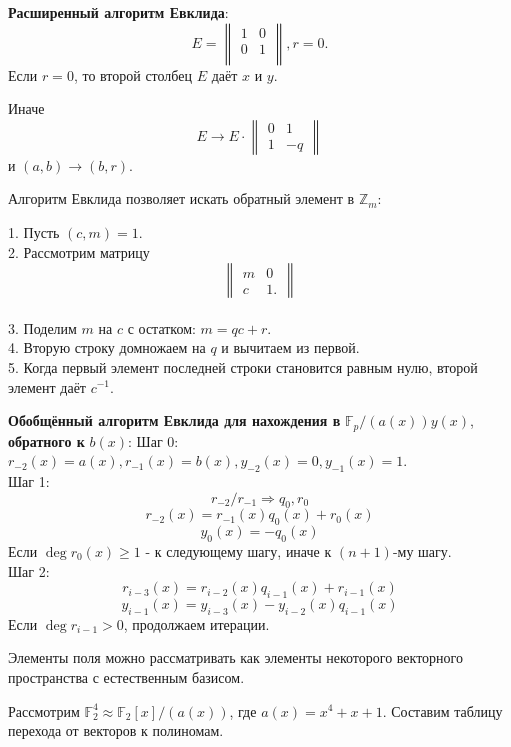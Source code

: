\documentclass[11pt]{article}
\newcounter{th}\setcounter{th}{0}
\begin{document}
\textbf{Расширенный алгоритм Евклида}:
\begin{equation*}
E = \begin{Vmatrix}
1 & 0 \\
0 & 1 \\
\end{Vmatrix},
r = 0.
\end{equation*}
Если $r = 0$, то второй столбец $E$ даёт $x$ и $y$.

Иначе \begin{equation}
E \to E \cdot \begin{Vmatrix}
0 & 1 \\
1 & -q
\end{Vmatrix}
\end{equation}
и $(a, b) \to (b, r)$.

Алгоритм Евклида позволяет искать обратный элемент в $\mathbb{Z}_m$:

1. Пусть $(c, m) = 1$. \\
2. Рассмотрим матрицу \begin{equation}
\begin{Vmatrix}
m & 0 \\
c & 1.
\end{Vmatrix}
\end{equation}\\
3. Поделим $m$ на $c$ с остатком: $m = qc + r$.\\
4. Вторую строку домножаем на $q$ и вычитаем из первой.\\
5. Когда первый элемент последней строки становится равным нулю, второй элемент даёт $c^{-1}$.

\textbf{Обобщённый алгоритм Евклида для нахождения в} \(\mathbb{F}_p/(a(x)) y(x)\), \textbf{обратного к} \(b(x)\):
Шаг 0: $r_{-2}(x) = a(x), r_{-1}(x) = b(x), y_{-2}(x) = 0, y_{-1}(x) = 1$.\\
Шаг 1: $$r_{-2} / r_{-1} \Rightarrow q_0, r_0$$
$$r_{-2}(x) = r_{-1}(x)q_0(x) + r_0(x)$$
$$y_0(x) = -q_0(x)$$
Если $\operatorname{deg} r_0(x) \geq 1$ - к следующему шагу, иначе к $(n + 1)$-му шагу.\\
Шаг 2: $$r_{i - 3}(x) = r_{i - 2}(x)q_{i - 1}(x) + r_{i - 1}(x)$$
$$y_{i - 1}(x) = y_{i - 3}(x) - y_{i - 2}(x)q_{i - 1}(x)$$
Если $\operatorname{deg}r_{i - 1} > 0$, продолжаем итерации.

Элементы поля можно рассматривать как элементы некоторого векторного пространства с естественным
базисом.

Рассмотрим \(\mathbb{F}_2^4 \approx \mathbb{F}_2[x] / (a(x))\), где \(a(x) = x^4 + x + 1\).
Составим таблицу перехода от векторов к полиномам.
\end{document}

